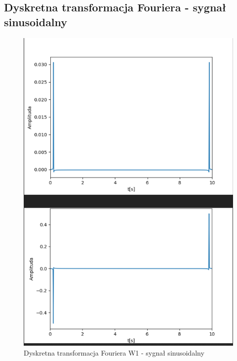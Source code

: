 \documentclass[12pt]{article}
\begin{document}
\subsection{Dyskretna transformacja Fouriera - sygnał sinusoidalny}
\begin{figure}[H]
\centering
\includegraphics[scale=0.6]{sinusDyskrW1.png}
\caption{Dyskretna transformacja Fouriera W1 - sygnał sinusoidalny}
\end{figure}
\end{document}
